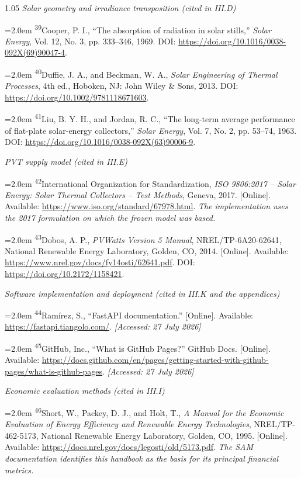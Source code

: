 \documentclass[12pt,letterpaper]{article}
\DeclareRobustCommand{\refanchor}[1]{\hypertarget{ref:#1}{#1}} %
\newcommand{\referenceheading}[1]{\vspace{1.55em}\textit{#1}\par\vspace{0.45em}}
\newcommand{\refentry}[1]{\hangindent=2.0em\hangafter=1 #1\par\vspace{0.2em}}
\begin{document}
\begin{spacing}{1.05}
\referenceheading{Solar geometry and irradiance transposition (cited in III.D)}

\refentry{
\textsuperscript{\refanchor{39}}Cooper, P. I., ``The absorption of radiation in solar stills,'' \textit{Solar Energy}, Vol. 12, No. 3, pp. 333--346, 1969. DOI: \url{https://doi.org/10.1016/0038-092X(69)90047-4}.
}

\refentry{
\textsuperscript{\refanchor{40}}Duffie, J. A., and Beckman, W. A., \textit{Solar Engineering of Thermal Processes}, 4th ed., Hoboken, NJ: John Wiley \& Sons, 2013. DOI: \url{https://doi.org/10.1002/9781118671603}.
}

\refentry{
\textsuperscript{\refanchor{41}}Liu, B. Y. H., and Jordan, R. C., ``The long-term average performance of flat-plate solar-energy collectors,'' \textit{Solar Energy}, Vol. 7, No. 2, pp. 53--74, 1963. DOI: \url{https://doi.org/10.1016/0038-092X(63)90006-9}.
}

\referenceheading{PVT supply model (cited in III.E)}

\refentry{
\textsuperscript{\refanchor{42}}International Organization for Standardization, \textit{ISO 9806:2017 -- Solar Energy: Solar Thermal Collectors -- Test Methods}, Geneva, 2017. [Online]. Available: \url{https://www.iso.org/standard/67978.html}. \textit{The implementation uses the 2017 formulation on which the frozen model was based.}
}

\refentry{
\textsuperscript{\refanchor{43}}Dobos, A. P., \textit{PVWatts Version 5 Manual}, NREL/TP-6A20-62641, National Renewable Energy Laboratory, Golden, CO, 2014. [Online]. Available: \url{https://www.nrel.gov/docs/fy14osti/62641.pdf}. DOI: \url{https://doi.org/10.2172/1158421}.
}

\referenceheading{Software implementation and deployment (cited in III.K and the appendices)}

\refentry{
\textsuperscript{\refanchor{44}}Ram\'irez, S., ``FastAPI documentation.'' [Online]. Available: \url{https://fastapi.tiangolo.com/}. \textit{[Accessed: 27 July 2026]}
}

\refentry{
\textsuperscript{\refanchor{45}}GitHub, Inc., ``What is GitHub Pages?'' GitHub Docs. [Online]. Available: \url{https://docs.github.com/en/pages/getting-started-with-github-pages/what-is-github-pages}. \textit{[Accessed: 27 July 2026]}
}

\referenceheading{Economic evaluation methods (cited in III.I)}

\refentry{
\textsuperscript{\refanchor{46}}Short, W., Packey, D. J., and Holt, T., \textit{A Manual for the Economic Evaluation of Energy Efficiency and Renewable Energy Technologies}, NREL/TP-462-5173, National Renewable Energy Laboratory, Golden, CO, 1995. [Online]. Available: \url{https://docs.nrel.gov/docs/legosti/old/5173.pdf}. \textit{The SAM documentation identifies this handbook as the basis for its principal financial metrics.}
}


\end{spacing}
\end{document}
